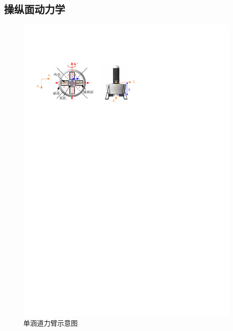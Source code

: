 \subsection{操纵面动力学}
\begin{figure}[htbp]
	\centering
	\includegraphics[scale=1]{Fig/Fig3.pdf}
	\caption{\label{DFUAV_arm}单涵道力臂示意图}
\end{figure}
